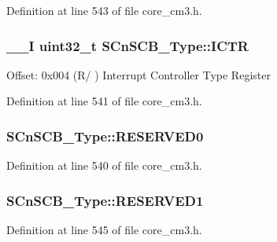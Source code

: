 Definition at line 543 of file core\-\_\-cm3.\-h.

\hypertarget{struct_s_cn_s_c_b___type_ad99a25f5d4c163d9005ca607c24f6a98}{
\subsubsection[{I\-C\-T\-R}]{\setlength{\rightskip}{0pt plus 5cm}\-\_\-\-\_\-\-I {\bf uint32\-\_\-t} S\-Cn\-S\-C\-B\-\_\-\-Type\-::\-I\-C\-T\-R}}\label{struct_s_cn_s_c_b___type_ad99a25f5d4c163d9005ca607c24f6a98}
Offset\-: 0x004 (R/ ) Interrupt Controller Type Register 

Definition at line 541 of file core\-\_\-cm3.\-h.

\hypertarget{struct_s_cn_s_c_b___type_a9c1cf408b90b40c62f396da41416290f}{
\subsubsection[{R\-E\-S\-E\-R\-V\-E\-D0}]{ S\-Cn\-S\-C\-B\-\_\-\-Type\-::\-R\-E\-S\-E\-R\-V\-E\-D0}}\label{struct_s_cn_s_c_b___type_a9c1cf408b90b40c62f396da41416290f}


Definition at line 540 of file core\-\_\-cm3.\-h.

\hypertarget{struct_s_cn_s_c_b___type_aa4e25c7691de11dd20a02d4732111496}{
\subsubsection[{R\-E\-S\-E\-R\-V\-E\-D1}]{ S\-Cn\-S\-C\-B\-\_\-\-Type\-::\-R\-E\-S\-E\-R\-V\-E\-D1}}\label{struct_s_cn_s_c_b___type_aa4e25c7691de11dd20a02d4732111496}


Definition at line 545 of file core\-\_\-cm3.\-h.



